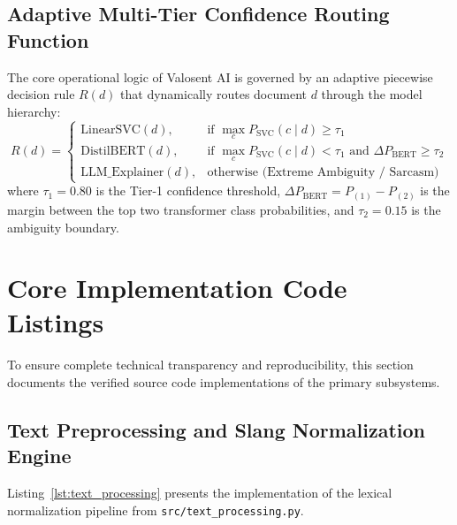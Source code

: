 \subsection{Adaptive Multi-Tier Confidence Routing Function}
The core operational logic of Valosent AI is governed by an adaptive piecewise decision rule $R(d)$ that dynamically routes document $d$ through the model hierarchy:
\begin{equation}
    R(d) = 
    \begin{cases}
        \text{LinearSVC}(d), & \text{if } \max_c P_{\text{SVC}}(c \mid d) \ge \tau_1 \\
        \text{DistilBERT}(d), & \text{if } \max_c P_{\text{SVC}}(c \mid d) < \tau_1 \text{ and } \Delta P_{\text{BERT}} \ge \tau_2 \\
        \text{LLM\_Explainer}(d), & \text{otherwise (Extreme Ambiguity / Sarcasm)}
    \end{cases}
    \label{eq:routing_rule}
\end{equation}
where $\tau_1 = 0.80$ is the Tier-1 confidence threshold, $\Delta P_{\text{BERT}} = P_{(1)} - P_{(2)}$ is the margin between the top two transformer class probabilities, and $\tau_2 = 0.15$ is the ambiguity boundary.

\section{Core Implementation Code Listings}
\label{sec:code_listings}

To ensure complete technical transparency and reproducibility, this section documents the verified source code implementations of the primary subsystems.

\subsection{Text Preprocessing and Slang Normalization Engine}
Listing~\ref{lst:text_processing} presents the implementation of the lexical normalization pipeline from \texttt{src/text\_processing.py}.

